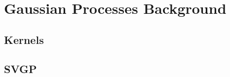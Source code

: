 \section{Gaussian Processes Background}

{\color{red} \lipsum[1-5]}




\subsection{Kernels}


\subsection{SVGP}




\clearpage
